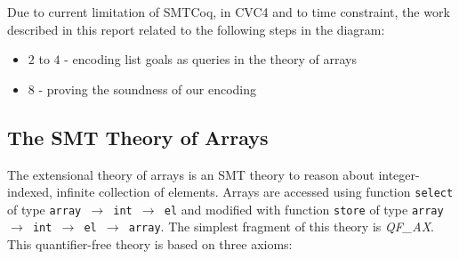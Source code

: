 \documentclass[onecolumn, preprint]{sigplanconf}
\begin{document}
Due to current limitation of SMTCoq, in CVC4 and to time constraint, the work described in this report related to the following steps in the diagram:
\begin{itemize}
  \item $2$ to $4$ - encoding list goals as queries in the theory of arrays
  \item $8$ - proving the soundness of our encoding
\end{itemize}




\subsection{The SMT Theory of Arrays}
The extensional theory of arrays is an SMT theory to reason about integer-indexed, infinite collection of elements. Arrays are accessed using function \texttt{select} of type \texttt{array $\rightarrow$ int $\rightarrow$ el} and modified with function \texttt{store} of type \texttt{array $\rightarrow$ int $\rightarrow$ el $\rightarrow$ array}. The simplest fragment of this theory is \emph{QF\_AX}. This quantifier-free theory is based on three axioms:
\end{document}
